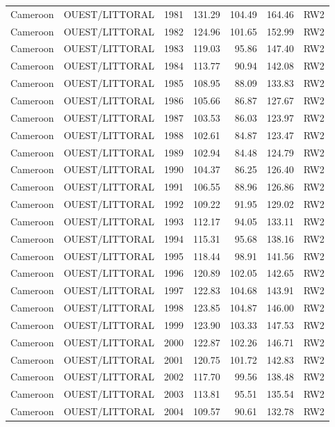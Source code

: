 \begin{longtable}{lllrrrl}
  Cameroon & OUEST/LITTORAL & 1981 & 131.29 & 104.49 & 164.46 & RW2 \\ 
  Cameroon & OUEST/LITTORAL & 1982 & 124.96 & 101.65 & 152.99 & RW2 \\ 
  Cameroon & OUEST/LITTORAL & 1983 & 119.03 & 95.86 & 147.40 & RW2 \\ 
  Cameroon & OUEST/LITTORAL & 1984 & 113.77 & 90.94 & 142.08 & RW2 \\ 
  Cameroon & OUEST/LITTORAL & 1985 & 108.95 & 88.09 & 133.83 & RW2 \\ 
  Cameroon & OUEST/LITTORAL & 1986 & 105.66 & 86.87 & 127.67 & RW2 \\ 
  Cameroon & OUEST/LITTORAL & 1987 & 103.53 & 86.03 & 123.97 & RW2 \\ 
  Cameroon & OUEST/LITTORAL & 1988 & 102.61 & 84.87 & 123.47 & RW2 \\ 
  Cameroon & OUEST/LITTORAL & 1989 & 102.94 & 84.48 & 124.79 & RW2 \\ 
  Cameroon & OUEST/LITTORAL & 1990 & 104.37 & 86.25 & 126.40 & RW2 \\ 
  Cameroon & OUEST/LITTORAL & 1991 & 106.55 & 88.96 & 126.86 & RW2 \\ 
  Cameroon & OUEST/LITTORAL & 1992 & 109.22 & 91.95 & 129.02 & RW2 \\ 
  Cameroon & OUEST/LITTORAL & 1993 & 112.17 & 94.05 & 133.11 & RW2 \\ 
  Cameroon & OUEST/LITTORAL & 1994 & 115.31 & 95.68 & 138.16 & RW2 \\ 
  Cameroon & OUEST/LITTORAL & 1995 & 118.44 & 98.91 & 141.56 & RW2 \\ 
  Cameroon & OUEST/LITTORAL & 1996 & 120.89 & 102.05 & 142.65 & RW2 \\ 
  Cameroon & OUEST/LITTORAL & 1997 & 122.83 & 104.68 & 143.91 & RW2 \\ 
  Cameroon & OUEST/LITTORAL & 1998 & 123.85 & 104.87 & 146.00 & RW2 \\ 
  Cameroon & OUEST/LITTORAL & 1999 & 123.90 & 103.33 & 147.53 & RW2 \\ 
  Cameroon & OUEST/LITTORAL & 2000 & 122.87 & 102.26 & 146.71 & RW2 \\ 
  Cameroon & OUEST/LITTORAL & 2001 & 120.75 & 101.72 & 142.83 & RW2 \\ 
  Cameroon & OUEST/LITTORAL & 2002 & 117.70 & 99.56 & 138.48 & RW2 \\ 
  Cameroon & OUEST/LITTORAL & 2003 & 113.81 & 95.51 & 135.54 & RW2 \\ 
  Cameroon & OUEST/LITTORAL & 2004 & 109.57 & 90.61 & 132.78 & RW2 \\ 

\end{longtable}
